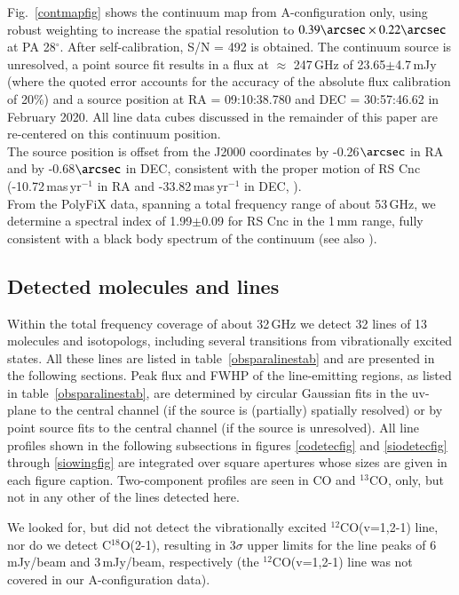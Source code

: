 \documentclass{aa}
\begin{document}
Fig.~\ref{contmapfig} shows the continuum map from A-configuration
only, using robust weighting to increase the spatial resolution to
$0.39\arcsec\times0.22\arcsec$ at PA 28$^{\circ}$. After
self-calibration, S/N = 492 is
obtained.  The continuum source is unresolved, a point source fit
results in a flux at $\approx$ 247\,GHz of 23.65$\pm$4.7\,mJy (where
the quoted error accounts for the accuracy of the  absolute flux
calibration of 20\%)  and a source position at RA = 09:10:38.780 and
DEC = 30:57:46.62 in February 2020. All line data cubes discussed in
the remainder of this paper are re-centered on this continuum
position.\\
The source position is offset from the J2000 coordinates by
-0.26$\arcsec$ in RA and by -0.68$\arcsec$  in DEC, consistent with
the proper motion of RS Cnc (-10.72\,mas\,yr$^{-1}$ in RA and
-33.82\,mas\,yr$^{-1}$ in DEC, \citet{GaiaeDR3,gaiabaylerjones2021}).\\

From the PolyFiX data, spanning a total frequency range of about
53\,GHz, we determine a spectral index of 1.99$\pm$0.09 for RS Cnc in
the 1\,mm range, fully consistent with a black body spectrum of the
continuum (see also \citet{lwlgm2010}).

\subsection{Detected molecules and lines}\label{linessec}

Within the total frequency coverage of about 32\,GHz we detect 32
lines of 13 molecules and isotopologs, including several transitions
from vibrationally excited states. All these lines are listed in
table~\ref{obsparalinestab} and are presented in the following
sections. Peak flux and FWHP of the line-emitting regions, as listed
in table~\ref{obsparalinestab}, are determined by circular Gaussian
fits in the uv-plane to the central channel (if the source is
(partially) spatially resolved) or by  point source fits to the
central channel (if the source is unresolved). All line profiles shown
in the following subsections in figures \ref{codetecfig} and
\ref{siodetecfig} through \ref{siowingfig}  are integrated over square
apertures whose sizes are given in each figure caption. Two-component
profiles are seen in CO and $^{13}$CO, only, but not in any other of
the lines detected here.

We looked for, but did not detect the vibrationally excited
$^{12}$CO(v=1,2-1) line, nor do we detect C$^{18}$O(2-1), resulting in
3$\sigma$ upper limits for the line peaks of 6\,mJy/beam and
3\,mJy/beam, respectively (the $^{12}$CO(v=1,2-1) line was not covered
in our A-configuration data). 
\end{document}
